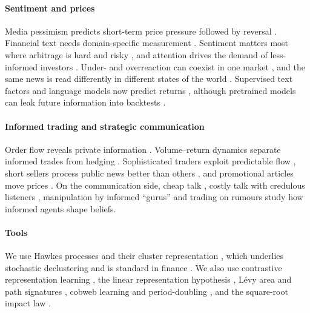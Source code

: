 \documentclass[11pt,a4paper]{article}
\theoremstyle{sci}
\theoremstyle{scidef}
\begin{document}
\paragraph{Sentiment and prices} Media pessimism predicts short-term price pressure followed by reversal \citep{tetlock2007}. Financial text needs domain-specific measurement \citep{loughran2011}. Sentiment matters most where arbitrage is hard and risky \citep{delong1990,shleifer1997,baker2006}, and attention drives the demand of less-informed investors \citep{barber2008,da2011}. Under- and overreaction can coexist in one market \citep{hong1999}, and the same news is read differently in different states of the world \citep{veronesi1999}. Supervised text factors and language models now predict returns \citep{ke2019,araci2019,lopezlira2023}, although pretrained models can leak future information into backtests \citep{glasserman2023}.

\paragraph{Informed trading and strategic communication} Order flow reveals private information \citep{kyle1985,glosten1985}. Volume--return dynamics separate informed trades from hedging \citep{llorente2002}. Sophisticated traders exploit predictable flow \citep{brunnermeier2005}, short sellers process public news better than others \citep{engelberg2012}, and promotional articles move prices \citep{kogan2023}. On the communication side, cheap talk \citep{crawford1982}, costly talk with credulous listeners \citep{kartik2007}, manipulation by informed ``gurus'' \citep{benabou1992} and trading on rumours \citep{vanbommel2003} study how informed agents shape beliefs.

\paragraph{Tools} We use Hawkes processes \citep{hawkes1971} and their cluster representation \citep{hawkesoakes1974}, which underlies stochastic declustering \citep{zhuang2002} and is standard in finance \citep{bacry2015}. We also use contrastive representation learning \citep{oord2018,reimers2019}, the linear representation hypothesis \citep{park2023}, L\'evy area and path signatures \citep{levy1940,lyons1998,chevyrev2016}, cobweb learning and period-doubling \citep{ezekiel1938,evans2001,may1976}, and the square-root impact law \citep{bouchaud2018}.

\end{document}
